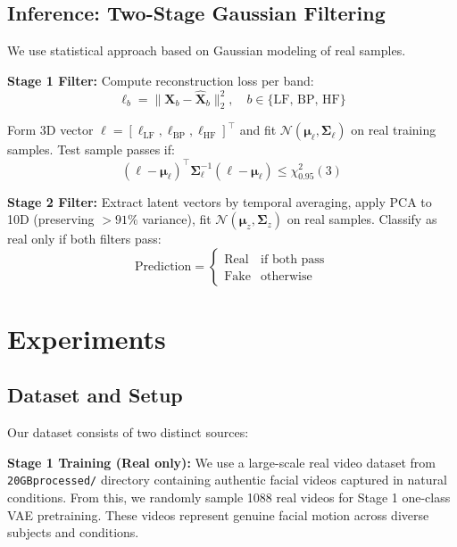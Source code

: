 \documentclass[10pt,twocolumn,letterpaper]{article}
\begin{document}
\subsection{Inference: Two-Stage Gaussian Filtering}

We use statistical approach based on Gaussian modeling of real samples.

\textbf{Stage 1 Filter:} Compute reconstruction loss per band:
\begin{equation}
\ell_b = \|\mathbf{X}_b - \hat{\mathbf{X}}_b\|_2^2, \quad b \in \{\text{LF, BP, HF}\}
\end{equation}

Form 3D vector $\mathbf{\ell} = [\ell_{\text{LF}}, \ell_{\text{BP}}, \ell_{\text{HF}}]^\top$ and fit $\mathcal{N}(\boldsymbol{\mu}_\ell, \boldsymbol{\Sigma}_\ell)$ on real training samples. Test sample passes if:
\begin{equation}
(\mathbf{\ell} - \boldsymbol{\mu}_\ell)^\top \boldsymbol{\Sigma}_\ell^{-1} (\mathbf{\ell} - \boldsymbol{\mu}_\ell) \leq \chi^2_{0.95}(3)
\end{equation}

\textbf{Stage 2 Filter:} Extract latent vectors by temporal averaging, apply PCA to 10D (preserving $>91\%$ variance), fit $\mathcal{N}(\boldsymbol{\mu}_z, \boldsymbol{\Sigma}_z)$ on real samples. Classify as real only if both filters pass:
\begin{equation}
\text{Prediction} = \begin{cases}
\text{Real} & \text{if both pass} \\
\text{Fake} & \text{otherwise}
\end{cases}
\end{equation}

\section{Experiments}

\subsection{Dataset and Setup}

Our dataset consists of two distinct sources:

\textbf{Stage 1 Training (Real only):} We use a large-scale real video dataset from \texttt{20GBprocessed/} directory containing authentic facial videos captured in natural conditions. From this, we randomly sample 1088 real videos for Stage 1 one-class VAE pretraining. These videos represent genuine facial motion across diverse subjects and conditions.
\end{document}
